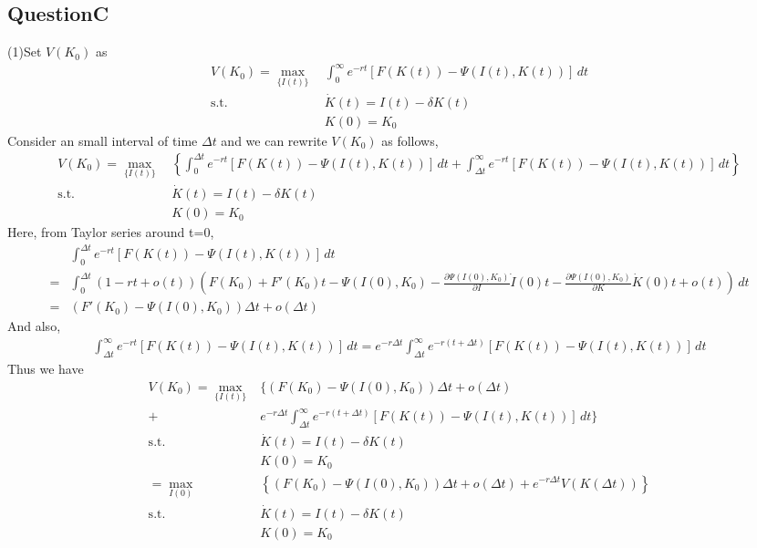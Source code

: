 \documentclass{article}
\begin{document}
\begin{CJK}{UTF8}{min}
\section*{QuestionC}
(1)\quad Set $V(K_0)$ as
\begin{align*}
V(K_0)=\max_{\{I(t)\}} \, &\int_0^\infty e^{-rt}[F(K(t))-\Psi(I(t),K(t))]\,dt\\
\mathrm{s.t.} \,\,&\dot K(t)=I(t)-\delta K(t)\\
&K(0)=K_0
\end{align*}
Consider an small interval of time $\Delta t$ and we can rewrite $V(K_0) $ as follows, \\
\begin{align*}
V(K_0)=\max_{\{I(t)\}} \, &\left\{\int_0^{\Delta t} e^{-rt}[F(K(t))-\Psi(I(t),K(t))]\,dt+\int_{\Delta t}^\infty e^{-rt}[F(K(t))-\Psi(I(t),K(t))]\,dt\right\}\\
\mathrm{s.t.} \,\,&\dot K(t)=I(t)-\delta K(t)\\
&K(0)=K_0
\end{align*}
Here, from Taylor series around t=0,
\begin{align*}
&\int_0^{\Delta t} e^{-rt}[F(K(t))-\Psi(I(t),K(t))]\,dt\\=&\int_0^{\Delta t}(1-rt+o(t))\left(F(K_0)+F'(K_0)t-\Psi(I(0),K_0)-\frac{\partial \Psi(I(0),K_0)}{\partial I}\dot I(0)t-\frac{\partial \Psi(I(0),K_0)}{\partial K}\dot K(0)t+o(t)\right)\,dt\\
=&(F'(K_0)-\Psi(I(0),K_0))\Delta t+o(\Delta t)
\end{align*}
And also,
\begin{align*}
\int_{\Delta t}^\infty e^{-rt}[F(K(t))-\Psi(I(t),K(t))]\,dt=e^{-r\Delta t}\int_{\Delta t}^\infty e^{-r(t+\Delta t)}[F(K(t))-\Psi(I(t),K(t))]\,dt
\end{align*}
Thus we have 
\begin{align*}
V(K_0)=\max_{\{I(t)\}}  &\Bigg\{(F(K_0)-\Psi(I(0),K_0))\Delta t+o(\Delta t)\\+&e^{-r\Delta t}\!\!\int_{\Delta t}^\infty e^{-r(t+\Delta t)}[F(K(t))-\Psi(I(t),K(t))]\,dt\Bigg\}\\
\mathrm{s.t.} \,\,&\dot K(t)=I(t)-\delta K(t)\\
&K(0)=K_0\\
=\max_{I(0)}  \, &\left\{(F(K_0)-\Psi(I(0),K_0))\Delta t+o(\Delta t)+e^{-r\Delta t}V(K(\Delta t))\right\}\\
\mathrm{s.t.} \,\,&\dot K(t)=I(t)-\delta K(t)\\
&K(0)=K_0\\

\end{align*}
\end{CJK}
\end{document}
